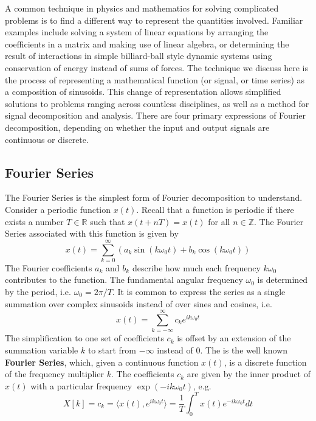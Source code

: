 A common technique in physics and mathematics for solving complicated problems is to find a different way to represent the quantities involved. Familiar examples include solving a system of linear equations by arranging the coefficients in a matrix and making use of linear algebra, or determining the result of interactions in simple billiard-ball style dynamic systems using conservation of energy instead of sums of forces. The technique we discuss here is the process of representing a mathematical function (or signal, or time series) as a composition of sinusoids. This change of representation allows simplified solutions to problems ranging across countless disciplines, as well as a method for signal decomposition and analysis. There are four primary expressions of Fourier decomposition, depending on whether the input and output signals are continuous or discrete.

\subsection{Fourier Series}
The Fourier Series is the simplest form of Fourier decomposition to understand. Consider a periodic function $x(t)$. Recall that a function is periodic if there exists a number $T\in \mathbb{R}$ such that $x(t+nT) = x(t)$ for all $n \in \mathbb{Z}$. The Fourier Series associated with this function is given by
\[
x(t) = \sum_{k=0}^{\infty}(a_k \sin(k\omega_0t) + b_k \cos(k\omega_0t))
\]
The Fourier coefficients $a_k$ and $b_k$ describe how much each frequency $k\omega_0$ contributes to the function. The fundamental angular frequency $\omega_0$ is determined by the period, i.e. $\omega_0 = 2\pi/T$. It is common to express the series as a single summation over complex sinusoids instead of over sines and cosines, i.e.
\[
x(t) = \sum_{k=-\infty}^{\infty}c_k e^{ik\omega_0t}
\]
The simplification to one set of coefficients $c_k$ is offset by an extension of the summation variable $k$ to start from $-\infty$ instead of $0$. The is the well known \textbf{Fourier Series}, which, given a continuous function $x(t)$, is a discrete function of the frequency multiplier $k$. The coefficients $c_k$ are given by the inner product of $x(t)$ with a particular frequency $\exp{(-ik\omega_0t)}$, e.g.
\[
X[k] = c_k = \langle x(t),e^{ik\omega_0t}\rangle = \dfrac{1}{T}\int_{0}^{T} x(t) e^{-ik\omega_0t} dt 
\]

